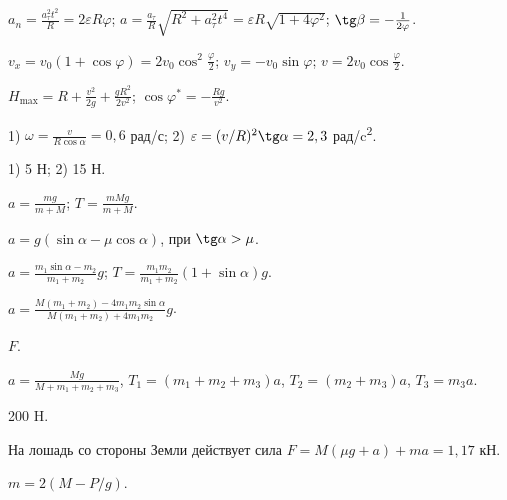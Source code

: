 \begin{Answer}{67}
$a_n = \frac{a_{\tau}^2 t^2}{R} = 2 \varepsilon R \varphi$; $a = \frac{a_{\tau}}{R} \sqrt{R^2 + a_{\tau}^2 t^4} = \varepsilon R \sqrt{1 + 4 \varphi^2}$; $\tg \beta = -\frac{1}{2\varphi}$.
\end{Answer}
\begin{Answer}{68}
$v_x = v_0 (1 + \cos \varphi) = 2v_0 \cos^2 \frac{\varphi}{2}$; $v_y = -v_0 \sin \varphi$; $v = 2v_0 \cos \frac{\varphi}{2}$.
\end{Answer}
\begin{Answer}{69}
$H_{\max} = R + \frac{v^2}{2g} + \frac{gR^2}{2v^2}$; $\cos \varphi^{*} = - \frac{Rg}{v^2}$.
\end{Answer}
\begin{Answer}{70}
1) $\omega = \frac{v}{R \cos \alpha} = 0,6$ рад/с; 2) $\varepsilon = (v/R)^2 \tg \alpha = 2,3$ рад/c\textsuperscript{2}.
\end{Answer}
\begin{Answer}{71}
1) 5 Н; 2) 15 Н.
\end{Answer}
\begin{Answer}{72}
$a = \frac{mg}{m+M}$; $T = \frac{mMg}{m+M}$.
\end{Answer}
\begin{Answer}{73}
$a = g (\sin \alpha - \mu \cos \alpha)$, при $\tg \alpha > \mu$.
\end{Answer}
\begin{Answer}{74}
$a = \frac{m_1 \sin \alpha - m_2}{m_1 + m_2}g$; $T = \frac{m_1 m_2}{m_1 + m_2}\left( 1+ \sin \alpha \right)g$.
\end{Answer}
\begin{Answer}{75}
$a = \frac{M(m_1 + m_2) - 4 m_1 m_2 \sin \alpha}{M(m_1 + m_2) + 4 m_1 m_2}g$.
\end{Answer}
\begin{Answer}{77}
$F$.
\end{Answer}
\begin{Answer}{83}
$a = \frac{Mg}{M + m_1 +m_2 +m_3}$, $T_1 = (m_1 +m_2 +m_3)a$, $T_2 = (m_2 +m_3)a$, $T_3 = m_3 a$.
\end{Answer}
\begin{Answer}{84}
200 H.
\end{Answer}
\begin{Answer}{86}
На лошадь со стороны Земли действует сила $F = M(\mu g + a) + ma = 1,17$ кН.
\end{Answer}
\begin{Answer}{87}
$m = 2(M - P/g)$.
\end{Answer}
